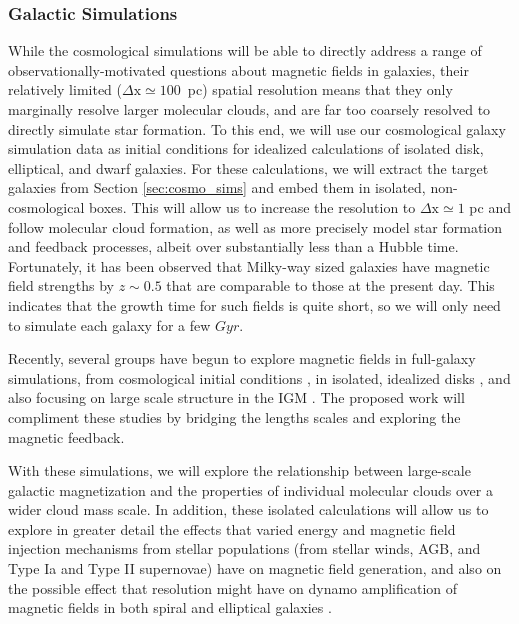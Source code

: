 \vspace{-3mm}
\subsubsection{Galactic Simulations}
\label{sec:molcloud_sims}
\vspace{-2mm}

While the cosmological simulations will be able to directly address a
range of observationally-motivated questions about magnetic fields in
galaxies, their relatively limited ($\Delta \mathrm{x} \simeq 100$~pc) spatial  resolution means that they only
 marginally resolve larger molecular clouds, and are far too
coarsely resolved to directly simulate star formation.  To this end,
we will use our cosmological galaxy simulation data as initial
conditions for idealized calculations of isolated disk, elliptical, and
dwarf galaxies.  
For these calculations, we will extract the target galaxies from Section
\ref{sec:cosmo_sims} and embed them in isolated, non-cosmological boxes.  This will allow us to
increase the resolution to $\Delta \mathrm{x} \simeq 1$ pc and follow molecular cloud
formation, as well as more precisely model star formation and feedback
processes, albeit over substantially less than a Hubble time.
Fortunately, it has been observed that Milky-way sized galaxies have 
magnetic field strengths by $z\sim 0.5$ that are comparable to those
at the present day.  This indicates that the growth time
for such fields is quite short, so we will only need to simulate each galaxy for
a few $Gyr$.  

Recently, several groups have begun to explore magnetic fields in full-galaxy
simulations,  from cosmological initial conditions
\citep{Pakmor17}, in isolated, idealized
disks \citep{Rieder16, Rieder17, Butsky17}, and also focusing on large scale structure in
the IGM \citep{Vazza17}.  The proposed work will compliment these studies by
bridging the lengths scales and exploring the magnetic feedback.

With these simulations, we will
explore the relationship between large-scale galactic magnetization
and the properties of individual molecular clouds over a wider cloud
mass scale.
In addition, these
isolated calculations will allow us to explore in greater detail the
effects that varied energy and magnetic field injection mechanisms from stellar
populations (from stellar winds, AGB, and Type Ia and Type II
supernovae) 
have on magnetic field generation, and also on the possible
effect that resolution might have on dynamo amplification of magnetic
fields in both spiral and elliptical galaxies \cite[an effect that was shown to
be important in high-redshift halos;
][]{2010ApJ...721L.134S,2013AN....334..531S}.

